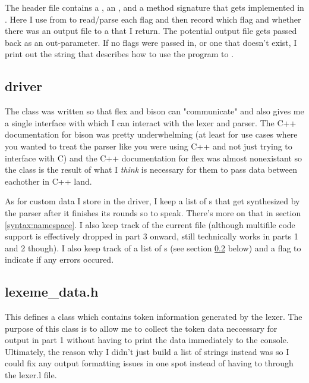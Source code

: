 \documentclass{article}
\begin{document}
\begin{displayquote}
    The header file contains a , an , and a method signature that gets implemented in .
    Here I use  from  to read/parse each flag and then record which flag and whether there was an output file to a  that I return.
    The potential output file gets passed back as an out-parameter.
    If no flags were passed in, or one that doesn't exist, I print out the string that describes how to use the program to .
\end{displayquote}

\subsection{driver}
\label{default:driver}
The  class was written so that flex and bison can "communicate" and also gives me a single interface with which I can interact with the lexer and parser.
The C++ documentation for bison was pretty underwhelming (at least for use cases where you wanted to treat the parser like you were using C++ and not just trying to interface with C)
and the C++ documentation for flex was almost nonexistant so the  class is the result of what I \emph{think} is necessary for them to pass data between eachother in C++ land.

As for custom data I store in the driver, I keep a list of s that get synthesized by the parser after it finishes its rounds so to speak.
There's more on that in section \ref{syntax:namespace}.
I also keep track of the current file (although multifile code support is effectively dropped in part 3 onward, still technically works in parts 1 and 2 though).
I also keep track of a list of s (see section \ref{default:lexemes} below) and a flag to indicate if any errors occured.

\subsection{lexeme\_data.h}
\label{default:lexemes}
This defines a class  which contains token information generated by the lexer.
The purpose of this class is to allow me to collect the token data neccessary for output in part 1 without having to print the data immediately to the console.
Ultimately, the reason why I didn't just build a list of strings instead was so I could fix any output formatting issues in one spot instead of having to  through the lexer.l file.
\end{document}
